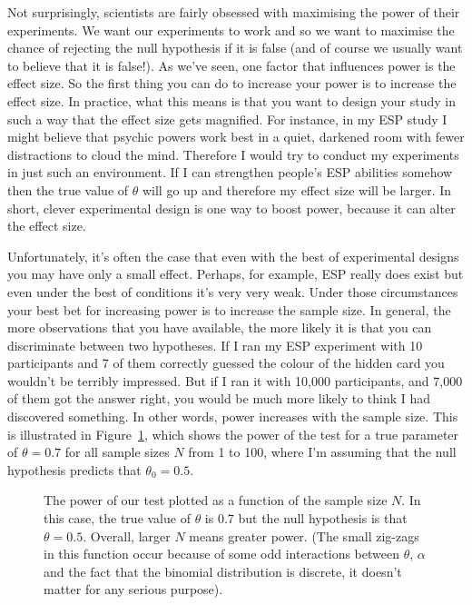 Not surprisingly, scientists are fairly obsessed with maximising the power of their experiments. We want our experiments to work and so we want to maximise the chance of rejecting the null hypothesis if it is false (and of course we usually want to believe that it is false!). As we've seen, one factor that influences power is the effect size. So the first thing you can do to increase your power is to increase the effect size. In practice, what this means is that you want to design your study in such a way that the effect size gets magnified. For instance, in my ESP study I might believe that psychic powers work best in a quiet, darkened room with fewer distractions to cloud the mind. Therefore I would try to conduct my experiments in just such an environment. If I can strengthen people's ESP abilities somehow then the true value of $\theta$ will go up and therefore my effect size will be larger. In short, clever experimental design is one way to boost power, because it can alter the effect size.

Unfortunately, it's often the case that even with the best of experimental designs you may have only a small effect. Perhaps, for example, ESP really does exist but even under the best of conditions it's very very weak. Under those circumstances your best bet for increasing power is to increase the sample size. In general, the more observations that you have available, the more likely it is that you can discriminate between two hypotheses. If I ran my ESP experiment with 10 participants and 7 of them correctly guessed the colour of the hidden card you wouldn't be terribly impressed. But if I ran it with 10,000 participants, and 7,000 of them got the answer right, you would be much more likely to think I had discovered something. In other words, power increases with the sample size. This is illustrated in Figure~\ref{fig:powerfunctionsample}, which shows the power of the test for a true parameter of $\theta = 0.7$ for all sample sizes $N$ from 1 to 100, where I'm assuming that the null hypothesis predicts that $\theta_0 = 0.5$.  

\begin{figure}[t]
\begin{center}
\caption{The power of our test plotted as a function of the sample size $N$. In this case, the true value of $\theta$ is 0.7 but the null hypothesis is that $\theta = 0.5$. Overall, larger $N$ means greater power. (The small zig-zags in this function occur because of some odd interactions between $\theta$, $\alpha$ and the fact that the binomial distribution is discrete, it doesn't matter for any serious purpose).}
\HR
\label{fig:powerfunctionsample}
\end{center}
\end{figure}


